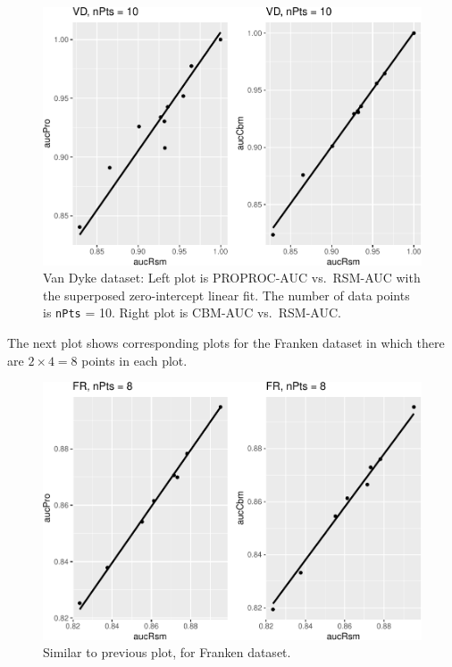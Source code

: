 \documentclass[
]{book}
\begin{document}
\begin{figure}
\centering
\includegraphics{12-rsm-3-fits_files/figure-latex/rsm-3-fits-plots-2-1.pdf}
\caption{\label{fig:rsm-3-fits-plots-2}Van Dyke dataset: Left plot is PROPROC-AUC vs.~RSM-AUC with the superposed zero-intercept linear fit. The number of data points is \texttt{nPts} = 10. Right plot is CBM-AUC vs.~RSM-AUC.}
\end{figure}

The next plot shows corresponding plots for the Franken dataset in which there are \(2\times 4 = 8\) points in each plot.

\begin{figure}
\centering
\includegraphics{12-rsm-3-fits_files/figure-latex/rsm-3-fits-plots-3-1.pdf}
\caption{\label{fig:rsm-3-fits-plots-3}Similar to previous plot, for Franken dataset.}
\end{figure}
\end{document}
